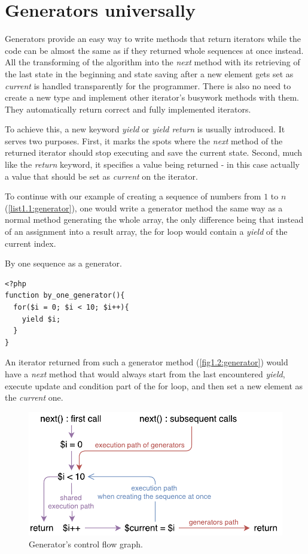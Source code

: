 \section{Generators universally}

Generators provide an easy way to write methods that return iterators while the code can be almost the same as if they returned whole sequences at once instead. All the transforming of the algorithm into the \emph{next} method with its retrieving of the last state in the beginning and state saving after a new element gets set as \emph{current} is handled transparently for the programmer. There is also no need to create a new type and implement other iterator’s busywork methods with them. They automatically return correct and fully implemented iterators.

To achieve this, a new keyword \emph{yield} or \emph{yield return} is usually introduced. It serves two purposes. First, it marks the spots where the \emph{next} method of the returned iterator should stop executing and save the current state. Second, much like the \emph{return} keyword, it specifies a value being returned - in this case actually a value that should be set as \emph{current} on the iterator.

To continue with our example of creating a sequence of numbers from $1$ to $n$ (\autoref{list1.1:generator}), one would write a generator method the same way as a normal method generating the whole array, the only difference being that instead of an assignment into a result array, the for loop would contain a \emph{yield} of the current index. 

\begin{listing}[H]
	\caption{By one sequence as a generator.}
	\label{list1.1:generator}
\begin{verbatim}
<?php
function by_one_generator(){
  for($i = 0; $i < 10; $i++){
    yield $i;
  }
}
\end{verbatim}
\end{listing}

An iterator returned from such a generator method (\autoref{fig1.2:generator}) would have a \emph{next} method that would always start from the last encountered \emph{yield}, execute update and condition part of the for loop, and then set a new element as the \emph{current} one.

\begin{figure}[h]
	\centering	
	\includegraphics[scale=0.75]{../img/1_2_generators}	
	\caption{Generator's control flow graph.}
	\label{fig1.2:generator}
\end{figure}

